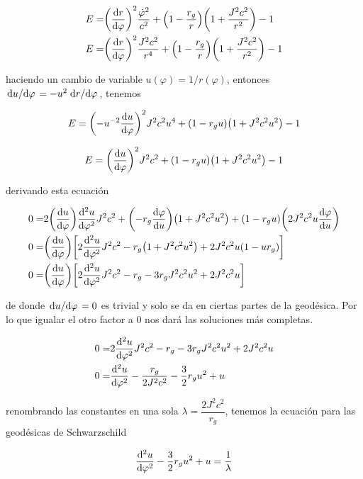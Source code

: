\documentclass[../Main.tex]{subfiles}
\begin{document}
\begin{align*}
    E = & \qty(\dv{r}{\varphi})^{2}\dfrac{\dot{\varphi}^{2}}{c^{2}} + \qty(1-\dfrac{r_{g}}{r})\qty(1 + \dfrac{J^{2}c^{2}}{r^{2}})-1 \\
    E = & \qty(\dv{r}{\varphi})^{2}\dfrac{J^{2}c^{2}}{r^{4}} + \qty(1-\dfrac{r_{g}}{r})\qty(1 + \dfrac{J^{2}c^{2}}{r^{2}})-1
\end{align*}

haciendo un cambio de variable $u(\varphi)=1/r(\varphi)$, entonces $\dv*{u}{\varphi}= -u^{2}\dv*{r}{\varphi}$, tenemos

\begin{equation*}
    E = \qty(-u^{-2}\dv{u}{\varphi})^{2}J^{2}c^{2}u^{4} + \qty(1-r_{g}u)\qty(1 + J^{2}c^{2}u^{2})-1
\end{equation*}

\begin{equation}
    E = \qty(\dv{u}{\varphi})^{2}J^{2}c^{2} + \qty(1-r_{g}u)\qty(1 + J^{2}c^{2}u^{2})-1
    \label{geodesicas:energia}
\end{equation}

derivando esta ecuación 

\begin{align*}
    0 = & 2\qty(\dv{u}{\varphi})\dv[2]{u}{\varphi}J^{2}c^{2} + \qty(-r_{g}\dv{\varphi}{u})\qty(1 + J^{2}c^{2}u^{2})+(1-r_{g}u)\qty(2J^{2}c^{2}u\dv{\varphi}{u}) \\
    0 = & \qty(\dv{u}{\varphi})\qty[2\dv[2]{u}{\varphi}J^{2}c^{2}-r_{g}\qty(1+J^{2}c^{2}u^{2})+2J^{2}c^{2}u(1-ur_{g})] \\
    0 = & \qty(\dv{u}{\varphi})\qty[2\dv[2]{u}{\varphi}J^{2}c^{2}-r_{g}-3r_{g}J^{2}c^{2}u^{2}+2J^{2}c^{2}u]
\end{align*}

de donde $\dv*{u}{\varphi} = 0$ es trivial y solo se da en ciertas partes de la geodésica. Por lo que igualar el otro factor a 0 nos dará las soluciones más completas.

\begin{align*}
    0 = & 2\dv[2]{u}{\varphi}J^{2}c^{2}-r_{g}-3r_{g}J^{2}c^{2}u^{2}+2J^{2}c^{2}u \\
    0 = & \dv[2]{u}{\varphi}-\dfrac{r_{g}}{2J^{2}c^{2}}-\frac{3}{2}r_{g}u^{2}+u
\end{align*}

renombrando las constantes en una sola $\lambda=\dfrac{2J^{2}c^{2}}{r_{g}}$, tenemos la ecuación para las geodésicas de Schwarzschild

\begin{equation}
    \dv[2]{u}{\varphi}-\frac{3}{2}r_{g}u^{2}+u = \frac{1}{\lambda}
\end{equation}
\end{document}
